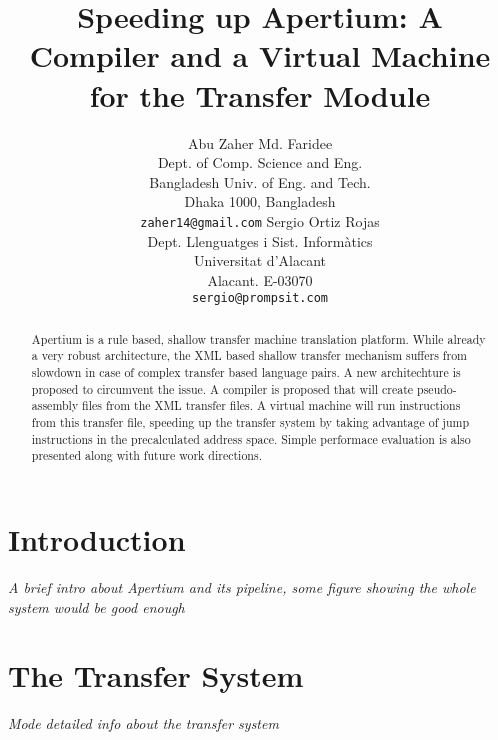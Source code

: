 \documentclass[11pt]{article}
\title{Speeding up Apertium: A Compiler and a Virtual Machine for the
  Transfer Module}
\author{Abu Zaher Md. Faridee\\
  Dept. of Comp. Science and Eng. \\
  Bangladesh Univ. of Eng. and Tech. \\
  Dhaka 1000, Bangladesh \\
  {\tt zaher14@gmail.com} \And
  Sergio Ortiz Rojas \\
  Dept. Llenguatges i Sist. Informàtics \\
  Universitat d'Alacant \\
  Alacant. E-03070 \\  
  {\tt sergio@prompsit.com}}
\date{}
\begin{document}
\maketitle

\begin{abstract}
  Apertium is a rule based, shallow transfer machine translation
  platform. While already a very robust architecture,  the XML based
  shallow transfer mechanism suffers from slowdown in case of complex
  transfer based language pairs. A new architechture is proposed to
  circumvent the issue. A compiler is proposed that will create
  pseudo-assembly files from the XML transfer files. A virtual machine
  will run instructions from this transfer file, speeding up the
  transfer system by taking advantage of jump instructions in the
  precalculated address space. Simple performace evaluation is also
  presented  along with future work directions.
\end{abstract}


\section{Introduction}
\label{sec:introduction}



{\itshape{A brief intro about Apertium and its pipeline, some figure
    showing the whole system would be good enough}}

\section{The Transfer System}
\label{sec:transfer-system}

{\itshape{Mode detailed info about the transfer system}}


\end{document}
